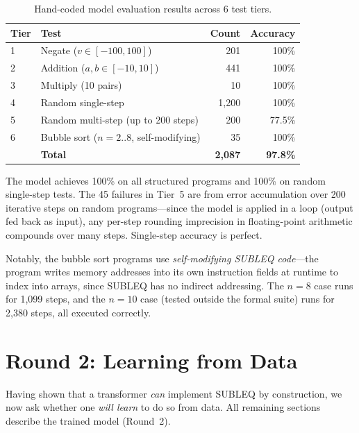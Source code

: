 \documentclass[11pt,a4paper]{article}
\begin{document}
\begin{table}[h]
\centering
\caption{Hand-coded model evaluation results across 6 test tiers.}
\label{tab:round1_eval}
\begin{tabular}{llrr}
\toprule
\textbf{Tier} & \textbf{Test} & \textbf{Count} & \textbf{Accuracy} \\
\midrule
1 & Negate ($v \in [-100, 100]$) & 201 & 100\% \\
2 & Addition ($a, b \in [-10, 10]$) & 441 & 100\% \\
3 & Multiply (10 pairs) & 10 & 100\% \\
4 & Random single-step & 1{,}200 & 100\% \\
5 & Random multi-step (up to 200 steps) & 200 & 77.5\% \\
6 & Bubble sort ($n = 2..8$, self-modifying) & 35 & 100\% \\
\midrule
& \textbf{Total} & \textbf{2{,}087} & \textbf{97.8\%} \\
\bottomrule
\end{tabular}
\end{table}

The model achieves 100\% on all structured programs and 100\% on random single-step tests.
The 45 failures in Tier~5 are from error accumulation over 200 iterative steps on random programs---since the model is applied in a loop (output fed back as input), any per-step rounding imprecision in floating-point arithmetic compounds over many steps.
Single-step accuracy is perfect.

Notably, the bubble sort programs use \emph{self-modifying SUBLEQ code}---the program writes memory addresses into its own instruction fields at runtime to index into arrays, since SUBLEQ has no indirect addressing.
The $n = 8$ case runs for 1{,}099 steps, and the $n = 10$ case (tested outside the formal suite) runs for 2{,}380 steps, all executed correctly.

\section{Round 2: Learning from Data}
\label{sec:round2}

Having shown that a transformer \emph{can} implement SUBLEQ by construction, we now ask whether one \emph{will learn} to do so from data.
All remaining sections describe the trained model (Round~2).
\end{document}

